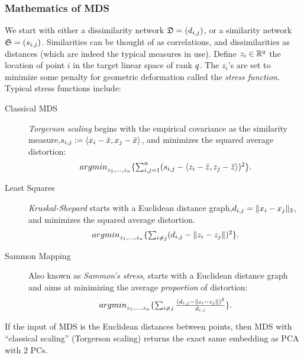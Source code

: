 \documentclass[12pt,a4paper]{article}
\begin{document}
\subsubsection{Mathematics of MDS}
We start with either a dissimilarity network $\mathfrak{D}=(d_{i,j})$, or a similarity network $\mathfrak{S}=(s_{i,j})$.
Similarities can be thought of as correlations, and dissimilarities as distances (which are indeed the typical measures in use).
Define $z_i \in \mathbb{R}^q$ the location of point $i$ in the target linear space of rank $q$. 
The $z_i$'s are set to minimize some penalty for geometric deformation called the \emph{stress function}.
Typical stress functions include:
\begin{description}
	
	\item[Classical MDS] \Aka \emph{Torgerson scaling} begins with the empirical covariance as the similarity measure,$s_{i,j}:= \left< x_i-\bar x,x_j-\bar{x} \right>$, and minimizes the squared average distortion:
	\begin{align}
	\label{eq:mds_classical}
	\textstyle{\mathop{argmin}_{z_1,\dots,z_n}}\{ \sum_{i,j=1}^{n} (s_{i,j}-\left< z_i-\bar z,z_j-\bar{z} \right> )^2 \}.
	\end{align}
	
	\item[Least Squares] \Aka \emph{Kruskal-Shepard} starts with a Euclidean distance graph,$d_{i,j}= \Vert x_i-x_j \Vert_2$, and minimizes the squared average distortion. 
	\begin{align}
	\label{eq:mds_stress}
	\textstyle{\mathop{argmin}_{z_1,\dots,z_n}}\{ \sum_{i \neq j} (d_{i,j}-\Vert z_i-z_j \Vert )^2 \}.
	\end{align}
	
	\item[Sammon Mapping] Also known as \emph{Sammon's stress}, starts with a Euclidean distance graph and aims at minimizing the average \emph{proportion} of distortion:
	\begin{align}
	\label{eq:mds_sammon}
	\textstyle{\mathop{argmin}_{z_1,\dots,z_n}}\{ \sum_{i \neq j} \frac{(d_{i,j}-\Vert z_i-z_j \Vert )^2}{d_{i,j}} \}.
	\end{align}
	
\end{description}




\begin{remark}
	If the input of MDS is the Euclidean distances between points, then MDS with ``classical scaling'' (\aka Torgerson scaling) returns the exact same embedding as PCA with $2$ PCs.
\end{remark}
\end{document}
